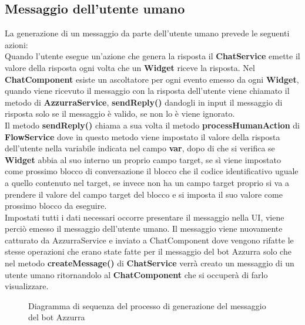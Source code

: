 \subsection{Messaggio dell’utente  umano}
La generazione di un messaggio da parte dell’utente  umano prevede le seguenti azioni:\\
Quando l'utente esegue un'azione che genera la risposta il \textbf{ChatService} emette il valore della risposta ogni volta che un \textbf{Widget} riceve la risposta. Nel \textbf{ChatComponent} esiste un ascoltatore per ogni evento emesso da ogni \textbf{Widget}, quando viene ricevuto il messaggio con la risposta dell'utente viene chiamato il metodo di \textbf{AzzurraService}, \textbf{sendReply()} dandogli in input il messaggio di risposta solo se il messaggio è valido, se non lo è viene ignorato.
\\
Il metodo \textbf{sendReply()} chiama a sua volta il metodo \textbf{processHumanAction} di \textbf{FlowService} dove in questo metodo viene impostato il valore della risposta dell'utente nella variabile indicata nel campo \textbf{var}, dopo di che si verifica se \textbf{Widget} abbia al suo interno un proprio campo target, se sì viene impostato come prossimo blocco di conversazione il blocco che il codice identificativo uguale a quello contenuto nel target, se invece non ha un campo target proprio si va a prendere il valore del campo target del blocco e si imposta il suo valore come prossimo blocco da eseguire. 
\\
Impostati tutti i dati necessari occorre presentare il messaggio nella UI, viene perciò emesso il messaggio dell'utente umano. Il messaggio viene nuovamente catturato da AzzurraService e inviato a ChatComponent dove vengono rifatte le stesse operazioni che erano state fatte per il messaggio del bot Azzurra solo che nel metodo \textbf{createMessage()} di \textbf{ChatService} verrà creato un messaggio di un utente umano ritornandolo al \textbf{ChatComponent} che si occuperà di farlo visualizzare.

\begin{figure}[htbp]
	\centering
	\caption{Diagramma di sequenza del processo di generazione del messaggio del bot Azzurra}
\end{figure}